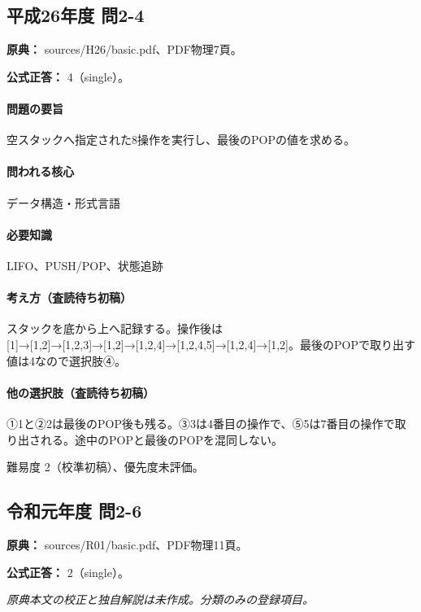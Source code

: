 \subsection{平成26年度 問2-4}
\label{q:h26-reg-basic-2-4}

\noindent\textbf{原典：} sources/H26/basic.pdf、PDF物理7頁。

\textbf{公式正答：} 4（single）。

\paragraph{問題の要旨} 空スタックへ指定された8操作を実行し、最後のPOPの値を求める。

\paragraph{問われる核心} データ構造・形式言語

\paragraph{必要知識} LIFO、PUSH/POP、状態追跡

\paragraph{考え方（査読待ち初稿）} スタックを底から上へ記録する。操作後は [1]→[1,2]→[1,2,3]→[1,2]→[1,2,4]→[1,2,4,5]→[1,2,4]→[1,2]。最後のPOPで取り出す値は4なので選択肢④。

\paragraph{他の選択肢（査読待ち初稿）} ①1と②2は最後のPOP後も残る。③3は4番目の操作で、⑤5は7番目の操作で取り出される。途中のPOPと最後のPOPを混同しない。

\par 難易度 2（校準初稿）、優先度未評価。

\subsection{令和元年度 問2-6}
\label{q:r01-reg-basic-2-6}

\noindent\textbf{原典：} sources/R01/basic.pdf、PDF物理11頁。

\textbf{公式正答：} 2（single）。

\par\textit{原典本文の校正と独自解説は未作成。分類のみの登録項目。}

